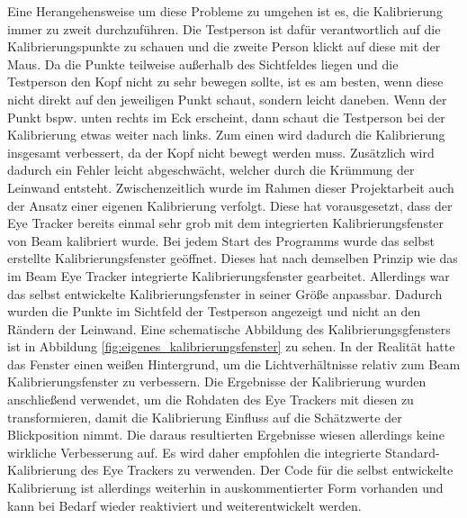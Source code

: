 Eine Herangehensweise um diese Probleme zu umgehen ist es, die Kalibrierung immer zu zweit durchzuführen. Die Testperson ist dafür verantwortlich auf die Kalibrierungspunkte zu schauen und die zweite Person klickt auf diese mit der Maus. Da die Punkte teilweise außerhalb des Sichtfeldes liegen und die Testperson den Kopf nicht zu sehr bewegen sollte, ist es am besten, wenn diese nicht direkt auf den jeweiligen Punkt schaut, sondern leicht daneben. Wenn der Punkt bspw. unten rechts im Eck erscheint, dann schaut die Testperson bei der Kalibrierung etwas weiter nach links. Zum einen wird dadurch die Kalibrierung insgesamt verbessert, da der Kopf nicht bewegt werden muss. Zusätzlich wird dadurch ein Fehler leicht abgeschwächt, welcher durch die Krümmung der Leinwand entsteht.
Zwischenzeitlich wurde im Rahmen dieser Projektarbeit auch der Ansatz einer eigenen Kalibrierung verfolgt. Diese hat vorausgesetzt, dass der Eye Tracker bereits einmal sehr grob mit dem integrierten Kalibrierungsfenster von Beam kalibriert wurde. Bei jedem Start des Programms wurde das selbst erstellte Kalibrierungsfenster geöffnet. Dieses hat nach demselben Prinzip wie das im Beam Eye Tracker integrierte Kalibrierungsfenster gearbeitet. Allerdings war das selbst entwickelte Kalibrierungsfenster in seiner Größe anpassbar. Dadurch wurden die Punkte im Sichtfeld der Testperson angezeigt und nicht an den Rändern der Leinwand. Eine schematische Abbildung des Kalibrierungsgfensters ist in Abbildung \ref{fig:eigenes_kalibrierungsfenster} zu sehen. In der Realität hatte das Fenster einen weißen Hintergrund, um die Lichtverhältnisse relativ zum Beam Kalibrierungsfenster zu verbessern. Die Ergebnisse der Kalibrierung wurden anschließend verwendet, um die Rohdaten des Eye Trackers mit diesen zu transformieren, damit die Kalibrierung Einfluss auf die Schätzwerte der Blickposition nimmt. Die daraus resultierten Ergebnisse wiesen allerdings keine wirkliche Verbesserung auf. Es wird daher empfohlen die integrierte Standard-Kalibrierung des Eye Trackers zu verwenden. Der Code für die selbst entwickelte Kalibrierung ist allerdings weiterhin in auskommentierter Form vorhanden und kann bei Bedarf wieder reaktiviert und weiterentwickelt werden. 

